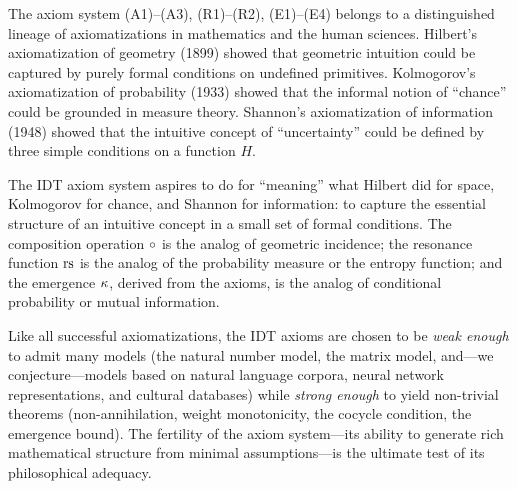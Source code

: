 \begin{remark}\label{rem:ch1:axiom_historical}
The axiom system (A1)--(A3), (R1)--(R2), (E1)--(E4) belongs to a
distinguished lineage of axiomatizations in mathematics and the human
sciences. Hilbert's axiomatization of geometry (1899) showed that
geometric intuition could be captured by purely formal conditions on
undefined primitives. Kolmogorov's axiomatization of probability (1933)
showed that the informal notion of ``chance'' could be grounded in
measure theory. Shannon's axiomatization of information (1948) showed
that the intuitive concept of ``uncertainty'' could be defined by three
simple conditions on a function $H$.

The IDT axiom system aspires to do for ``meaning'' what Hilbert did for
space, Kolmogorov for chance, and Shannon for information: to capture
the essential structure of an intuitive concept in a small set of
formal conditions. The composition operation $\circ$ is the analog of
geometric incidence; the resonance function $\mathrm{rs}$ is the analog of the
probability measure or the entropy function; and the emergence
$\kappa$, derived from the axioms, is the analog of conditional
probability or mutual information.

Like all successful axiomatizations, the IDT axioms are chosen to be
\emph{weak enough} to admit many models (the natural number model, the
matrix model, and---we conjecture---models based on natural language
corpora, neural network representations, and cultural databases) while
\emph{strong enough} to yield non-trivial theorems (non-annihilation,
weight monotonicity, the cocycle condition, the emergence bound). The
fertility of the axiom system---its ability to generate rich
mathematical structure from minimal assumptions---is the ultimate test
of its philosophical adequacy.
\end{remark}

